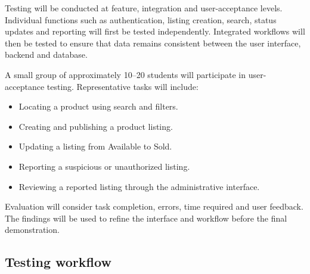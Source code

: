 \documentclass[11pt,a4paper]{article}
\begin{document}
Testing will be conducted at feature, integration and user-acceptance
levels. Individual functions such as authentication, listing
creation, search, status updates and reporting will first be tested
independently. Integrated workflows will then be tested to ensure
that data remains consistent between the user interface, backend and
database.

A small group of approximately 10--20 students will participate in
user-acceptance testing. Representative tasks will include:

\begin{itemize}

    \item Locating a product using search and filters.

    \item Creating and publishing a product listing.

    \item Updating a listing from Available to Sold.

    \item Reporting a suspicious or unauthorized listing.

    \item Reviewing a reported listing through the administrative
    interface.

\end{itemize}

Evaluation will consider task completion, errors, time required and
user feedback. The findings will be used to refine the interface and
workflow before the final demonstration.


\subsection{Testing workflow}

\end{document}
